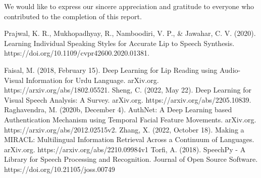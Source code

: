 \documentclass[conference]{IEEEtran}
\begin{document}
We would like to express our sincere appreciation and gratitude to everyone who contributed to the completion of this report.


\begin{thebibliography}{00}
 Prajwal, K. R., Mukhopadhyay, R., Namboodiri, V. P., & Jawahar, C. V. (2020). Learning Individual Speaking Styles for Accurate Lip to Speech Synthesis. https://doi.org/10.1109/cvpr42600.2020.01381.

 Faisal, M. (2018, February 15). Deep Learning for Lip Reading using Audio-Visual Information for Urdu Language. arXiv.org. https://arxiv.org/abs/1802.05521.
 Sheng, C. (2022, May 22). Deep Learning for Visual Speech Analysis: A Survey. arXiv.org. https://arxiv.org/abs/2205.10839.
 Raghavendra, M. (2020b, December 4). AuthNet: A Deep Learning based Authentication Mechanism using Temporal Facial Feature Movements. arXiv.org. https://arxiv.org/abs/2012.02515v2.
 Zhang, X. (2022, October 18). Making a MIRACL: Multilingual Information Retrieval Across a Continuum of Languages. arXiv.org. https://arxiv.org/abs/2210.09984v1
 Torfi, A. (2018). SpeechPy - A Library for Speech Processing and Recognition. Journal of Open Source Software. https://doi.org/10.21105/joss.00749
\end{thebibliography}
\vspace{12pt}
\end{document}

